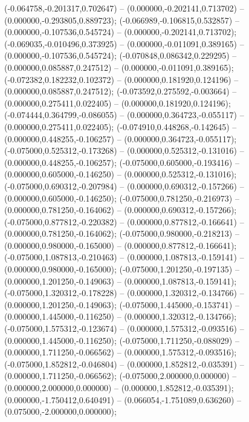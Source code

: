  (-0.064758,-0.201317,0.702647) -- (0.000000,-0.202141,0.713702) -- (0.000000,-0.293805,0.889723);
 (-0.066989,-0.106815,0.532857) -- (0.000000,-0.107536,0.545724) -- (0.000000,-0.202141,0.713702);
 (-0.069035,-0.010496,0.373925) -- (0.000000,-0.011091,0.389165) -- (0.000000,-0.107536,0.545724);
 (-0.070848,0.086342,0.229295) -- (0.000000,0.085887,0.247512) -- (0.000000,-0.011091,0.389165);
 (-0.072382,0.182232,0.102372) -- (0.000000,0.181920,0.124196) -- (0.000000,0.085887,0.247512);
 (-0.073592,0.275592,-0.003664) -- (0.000000,0.275411,0.022405) -- (0.000000,0.181920,0.124196);
 (-0.074444,0.364799,-0.086055) -- (0.000000,0.364723,-0.055117) -- (0.000000,0.275411,0.022405);
 (-0.074910,0.448268,-0.142645) -- (0.000000,0.448255,-0.106257) -- (0.000000,0.364723,-0.055117);
 (-0.075000,0.525312,-0.173268) -- (0.000000,0.525312,-0.131016) -- (0.000000,0.448255,-0.106257);
 (-0.075000,0.605000,-0.193416) -- (0.000000,0.605000,-0.146250) -- (0.000000,0.525312,-0.131016);
 (-0.075000,0.690312,-0.207984) -- (0.000000,0.690312,-0.157266) -- (0.000000,0.605000,-0.146250);
 (-0.075000,0.781250,-0.216973) -- (0.000000,0.781250,-0.164062) -- (0.000000,0.690312,-0.157266);
 (-0.075000,0.877812,-0.220382) -- (0.000000,0.877812,-0.166641) -- (0.000000,0.781250,-0.164062);
 (-0.075000,0.980000,-0.218213) -- (0.000000,0.980000,-0.165000) -- (0.000000,0.877812,-0.166641);
 (-0.075000,1.087813,-0.210463) -- (0.000000,1.087813,-0.159141) -- (0.000000,0.980000,-0.165000);
 (-0.075000,1.201250,-0.197135) -- (0.000000,1.201250,-0.149063) -- (0.000000,1.087813,-0.159141);
 (-0.075000,1.320312,-0.178228) -- (0.000000,1.320312,-0.134766) -- (0.000000,1.201250,-0.149063);
 (-0.075000,1.445000,-0.153741) -- (0.000000,1.445000,-0.116250) -- (0.000000,1.320312,-0.134766);
 (-0.075000,1.575312,-0.123674) -- (0.000000,1.575312,-0.093516) -- (0.000000,1.445000,-0.116250);
 (-0.075000,1.711250,-0.088029) -- (0.000000,1.711250,-0.066562) -- (0.000000,1.575312,-0.093516);
 (-0.075000,1.852812,-0.046804) -- (0.000000,1.852812,-0.035391) -- (0.000000,1.711250,-0.066562);
 (-0.075000,2.000000,0.000000) -- (0.000000,2.000000,0.000000) -- (0.000000,1.852812,-0.035391);
 (0.000000,-1.750412,0.640491) -- (0.066054,-1.751089,0.636260) -- (0.075000,-2.000000,0.000000);
